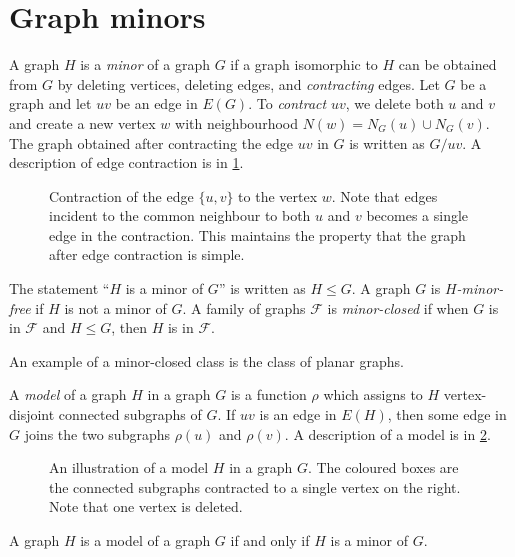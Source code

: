 \section{Graph minors}
A graph \(H\) is a \textit{minor} of a graph \(G\) if a graph isomorphic to \(H\) can be obtained from \(G\) by deleting vertices, deleting edges, and \textit{contracting} edges. Let $G$ be a graph and let $uv$ be an edge in $E(G)$. To \textit{contract} \(uv\), we delete both \(u\) and \(v\) and create a new vertex \(w\) with neighbourhood \(N(w) = N_G(u) \cup N_G(v)\). The graph obtained after contracting the edge \(uv\) in $G$ is written as \(G/uv\).
A description of edge contraction is in \cref{fig:edge_contraction}.
\begin{figure}[h!]
	\centering
	
	\caption[Edge contraction]{Contraction of the edge $\{u, v\}$ to the vertex $w$. Note that edges incident to the common neighbour to both $u$ and $v$ becomes a single edge in the contraction. This maintains the property that the graph after edge contraction is simple.}\label{fig:edge_contraction}
\end{figure}

The statement ``\(H\) is a minor of \(G\)'' is written as \(H \leq G\). A graph \(G\) is \textit{\(H\)-minor-free} if $H$ is not a minor of $G$. A family of graphs \(\mathcal{F}\) is \textit{minor-closed} if when $G$ is in \(\mathcal{F}\) and \(H \leq G\), then $H$ is in \(\mathcal{F}\).

An example of a minor-closed class is the class of planar graphs.

A \textit{model} of a graph \(H\) in a graph \(G\) is a function $\rho$ which assigns to \(H\) vertex-disjoint connected subgraphs of \(G\). If $uv$ is an edge in \(E(H)\), then some edge in \(G\) joins the two subgraphs \(\rho(u)\) and \(\rho(v)\). A description of a model is in \cref{fig:model_of_P5}.
\begin{figure}[h!]
	\centering
	
	\caption[A model $H$ in a graph $G$.]{An illustration of a model $H$ in a graph $G$. The coloured boxes are the connected subgraphs contracted to a single vertex on the right. Note that one vertex is deleted.}\label{fig:model_of_P5}
\end{figure}

\begin{lemma}
	A graph \(H\) is a model of a graph \(G\) if and only if $H$ is a minor of $G$.
\end{lemma}

